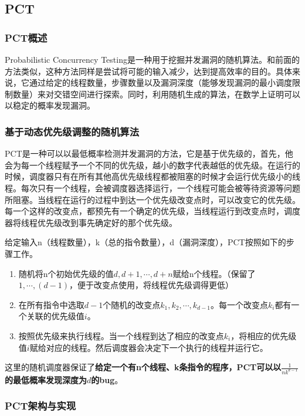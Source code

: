 \subsection{PCT}

\subsubsection{PCT概述}

Probabilistic Concurrency Testing是一种用于挖掘并发漏洞的随机算法。和前面的方法类似，这种方法同样是尝试将可能的输入减少，达到提高效率的目的。具体来说，它通过给定的线程数量，步骤数量以及漏洞深度（能够发现漏洞的最小调度限制数量）来对交错空间进行探索。同时，利用随机生成的算法，在数学上证明可以以稳定的概率发现漏洞。

\subsubsection{基于动态优先级调整的随机算法}

PCT是一种可以以最低概率检测并发漏洞的方法，它是基于优先级的，首先，他会为每一个线程赋予一个不同的优先级，越小的数字代表越低的优先级。在运行的时候，调度器只有在所有其他高优先级线程都被阻塞的时候才会运行优先级小的线程。每次只有一个线程，会被调度器选择运行，一个线程可能会被等待资源等问题所阻塞。当线程在运行的过程中到达一个优先级改变点时，可以改变它的优先级。每一个这样的改变点，都预先有一个确定的优先级，当线程运行到改变点时，调度器将线程优先级改到事先确定好的那个优先级。

给定输入n（线程数量），k（总的指令数量），d（漏洞深度），PCT按照如下的步骤工作。

\begin{enumerate}
\item 随机将n个初始优先级的值$d, d+1, \cdots, d+n$赋给n个线程。（保留了$1,\cdots, (d-1)$，便于改变点使用，将线程优先级调得更低）
\item 在所有指令中选取$d-1$个随机的改变点$k_1, k_2, \cdots, k_{d-1}$。每一个改变点$k_i$都有一个关联的优先级值$i$。
\item 按照优先级来执行线程。当一个线程到达了相应的改变点$k_i$，将相应的优先级值$i$赋给对应的线程。然后调度器会决定下一个执行的线程并运行它。
\end{enumerate}

这里的随机调度器保证了\textbf{给定一个有n个线程、k条指令的程序，PCT可以以$\frac{1}{nk^{d-1}}$的最低概率发现深度为$d$的bug}。

\subsubsection{PCT架构与实现}

